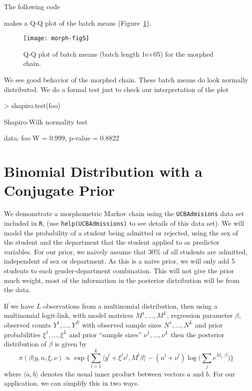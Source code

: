 \documentclass{article}
\newcommand{\inner}[1]{\langle #1 \rangle}
\begin{document}
The following code
\begin{Schunk}
\end{Schunk}
makes a Q-Q plot of the batch means (Figure~\ref{fig:fig5}).
\begin{figure}
\begin{center}
\texttt{[image: morph-fig5]}
\end{center}
\caption{Q-Q plot of batch means (batch length 1e+05)
for the morphed chain.}
\label{fig:fig5}
\end{figure}
We see good behavior of the morphed chain.  These batch means do
look normally distributed.
We do a formal test just to check our interpretation of the plot
\begin{Schunk}
\begin{Sinput}
> shapiro.test(foo)
\end{Sinput}
\begin{Soutput}
	Shapiro-Wilk normality test

data:  foo 
W = 0.999, p-value = 0.8822
\end{Soutput}
\end{Schunk}

\section{Binomial Distribution with a Conjugate Prior}

We demonstrate a morphometric Markov chain using the \texttt{UCBAdmisions}
data set included in \texttt{R}, (use \texttt{help(UCBAdmissions)} to see
details of this data set).  We will model the probability of a student
being admitted or rejected, using the sex of the student and the department
that the student applied to as predictor variables.  For our prior, we
naively assume that 30\% of all students are admitted, independent of sex
or department.  As this is a naive prior, we will only add 5 students to
each gender-department combination.  This will not give the prior much
weight, most of the information in the posterior distribution will be from
the data.

If we have $L$ observations from a multinomial distribution, then using a
multinomial logit-link, with model matrices $M^1,\dots,M^L$, regression
parameter $\beta$, observed counts $Y^1,\dots,Y^N$ with observed sample
sizes $N^1,\dots,N^L$ and prior probabilities $\xi^1, \dots, \xi^L$ and
prior ``sample sizes'' $\nu^1,\dots,\nu^L$ then the posterior distribution
of $\beta$ is given by \citep[Sec. 5.1.2]{johnson-thesis}
\begin{equation}\label{eq:mult-post-conj-complicated}
\pi(\beta|y,n,\xi,\nu) \propto \exp\biggl\{ \sum_{l=1}^L \inner{y^l + \xi^l
    \nu^l, M^l \beta} - (n^l + \nu^l) \log\bigl(
    \sum_j e^{M_{j\cdot} \beta} \bigr) \biggr\}
\end{equation}
where $\inner{a, b}$ denotes the usual inner product between vectors $a$
and $b$.  For our application, we can simplify this in two ways.
\end{document}
